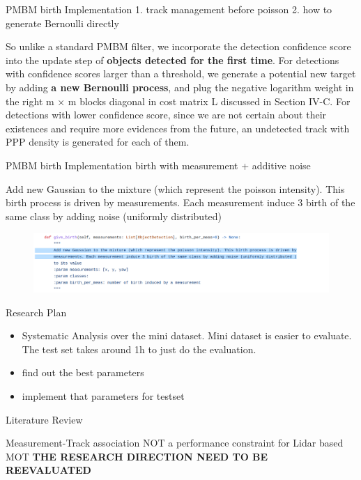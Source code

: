 \documentclass[aspectratio=169,xcolor=dvipsnames]{beamer}
\begin{document}
\begin{frame}{PMBM birth Implementation}
    1. track management before poisson
    2. how to generate Bernoulli directly
    \begin{block}{}
    So unlike a standard PMBM filter, we incorporate the detection confidence score into the update step 
    of \textbf{objects detected for the first time}. 
    For detections with confidence scores larger than a threshold, 
    we generate a potential new target by adding \textbf{a new Bernoulli process}, 
    and plug the negative logarithm weight in the right m × m blocks diagonal in cost matrix L 
    discussed in Section IV-C. For detections with lower confidence score, 
    since we are not certain about their existences and require more evidences from the future, 
    an undetected track with PPP density is generated for each of them.
    \href{https://www.researchgate.net/publication/355428771_3D_Multi-Object_Tracking_using_Random_Finite_Set-based_Multiple_Measurement_Models_Filtering_RFS-M_3_for_Autonomous_Vehicles}{}
    \end{block}
\end{frame}

\begin{frame}{PMBM birth Implementation}
    birth with measurement + additive noise
    \begin{block}{}
    Add new Gaussian to the mixture (which represent the poisson intensity). This birth process is driven by
    measurements. Each measurement induce 3 birth of the same class by adding noise (uniformly distributed)
    \href{https://github.com/quan-dao/pmbm-filter/blob/5cdf8b31665f1a7008afa963c1ab7c3b048b5856/poisson.py}{}
    \end{block}
    \begin{figure}
        \includegraphics[width=0.9\linewidth]{pmbm/1.png}
    \end{figure}
\end{frame}

\begin{frame}{Research Plan}
    \begin{itemize}
        \item{Systematic Analysis over the mini dataset. Mini dataset is easier to evaluate. The test set takes around 1h to just do the evaluation.}
        \item{find out the best parameters}
        \item{implement that parameters for testset}
    \end{itemize}
\end{frame}

\begin{frame}{Literature Review}
\begin{block}{Measurement-Track association NOT a performance constraint for Lidar based MOT}
    \textbf{THE RESEARCH DIRECTION NEED TO BE REEVALUATED}
\end{block}
\end{frame}
\end{document}
